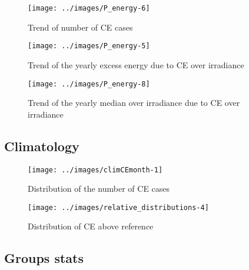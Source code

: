 \documentclass[
]{article}
\begin{document}
\begin{figure}[h!]

{\centering \texttt{[image: ../images/P\_energy-6]} 

}

\caption{Trend of number of CE cases}\label{fig:unnamed-chunk-2}
\end{figure}

\begin{figure}[h!]

{\centering \texttt{[image: ../images/P\_energy-5]} 

}

\caption{Trend of the yearly excess energy due to CE over irradiance}\label{fig:unnamed-chunk-3}
\end{figure}

\begin{figure}[h!]

{\centering \texttt{[image: ../images/P\_energy-8]} 

}

\caption{Trend of the yearly median over irradiance due to CE over irradiance}\label{fig:unnamed-chunk-4}
\end{figure}

\FloatBarrier

\hypertarget{climatology}{%
\subsection{Climatology}\label{climatology}}

\begin{figure}[h!]

{\centering \texttt{[image: ../images/climCEmonth-1]} 

}

\caption{Distribution of the number of CE cases}\label{fig:unnamed-chunk-5}
\end{figure}

\begin{figure}[h!]

{\centering \texttt{[image: ../images/relative\_distributions-4]} 

}

\caption{Distribution of CE above reference}\label{fig:unnamed-chunk-6}
\end{figure}

\FloatBarrier

\hypertarget{groups-stats}{%
\subsection{Groups stats}\label{groups-stats}}
\end{document}
